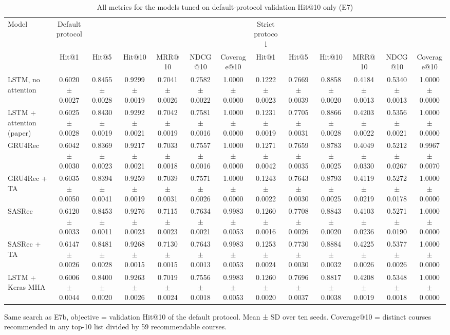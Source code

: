 \begin{table}[t]\centering\footnotesize
\caption{All metrics for the models tuned on default-protocol validation Hit@10 only (E7)}
\begin{tabular}{lcccccccccccc}\toprule
Model & Default protocol &  &  &  &  &  & Strict protocol &  &  &  &  &  \\
 & Hit@1 & Hit@5 & Hit@10 & MRR@10 & NDCG@10 & Coverage@10 & Hit@1 & Hit@5 & Hit@10 & MRR@10 & NDCG@10 & Coverage@10 \\
\midrule
LSTM, no attention & 0.6020 $\pm$ 0.0027 & 0.8455 $\pm$ 0.0028 & 0.9299 $\pm$ 0.0019 & 0.7041 $\pm$ 0.0026 & 0.7582 $\pm$ 0.0022 & 1.0000 $\pm$ 0.0000 & 0.1222 $\pm$ 0.0023 & 0.7669 $\pm$ 0.0039 & 0.8858 $\pm$ 0.0020 & 0.4184 $\pm$ 0.0013 & 0.5340 $\pm$ 0.0013 & 1.0000 $\pm$ 0.0000 \\
LSTM + attention (paper) & 0.6025 $\pm$ 0.0028 & 0.8430 $\pm$ 0.0019 & 0.9292 $\pm$ 0.0021 & 0.7042 $\pm$ 0.0019 & 0.7581 $\pm$ 0.0016 & 1.0000 $\pm$ 0.0000 & 0.1231 $\pm$ 0.0019 & 0.7705 $\pm$ 0.0031 & 0.8866 $\pm$ 0.0028 & 0.4203 $\pm$ 0.0022 & 0.5356 $\pm$ 0.0021 & 1.0000 $\pm$ 0.0000 \\
GRU4Rec & 0.6042 $\pm$ 0.0030 & 0.8369 $\pm$ 0.0023 & 0.9217 $\pm$ 0.0021 & 0.7033 $\pm$ 0.0018 & 0.7557 $\pm$ 0.0016 & 1.0000 $\pm$ 0.0000 & 0.1271 $\pm$ 0.0042 & 0.7659 $\pm$ 0.0035 & 0.8783 $\pm$ 0.0025 & 0.4049 $\pm$ 0.0330 & 0.5212 $\pm$ 0.0267 & 0.9967 $\pm$ 0.0070 \\
GRU4Rec + TA & 0.6035 $\pm$ 0.0050 & 0.8394 $\pm$ 0.0041 & 0.9259 $\pm$ 0.0019 & 0.7039 $\pm$ 0.0031 & 0.7571 $\pm$ 0.0026 & 1.0000 $\pm$ 0.0000 & 0.1243 $\pm$ 0.0022 & 0.7643 $\pm$ 0.0030 & 0.8793 $\pm$ 0.0025 & 0.4119 $\pm$ 0.0219 & 0.5272 $\pm$ 0.0178 & 1.0000 $\pm$ 0.0000 \\
SASRec & 0.6120 $\pm$ 0.0033 & 0.8453 $\pm$ 0.0011 & 0.9276 $\pm$ 0.0023 & 0.7115 $\pm$ 0.0023 & 0.7634 $\pm$ 0.0021 & 0.9983 $\pm$ 0.0053 & 0.1260 $\pm$ 0.0016 & 0.7708 $\pm$ 0.0026 & 0.8843 $\pm$ 0.0020 & 0.4103 $\pm$ 0.0236 & 0.5271 $\pm$ 0.0190 & 1.0000 $\pm$ 0.0000 \\
SASRec + TA & 0.6147 $\pm$ 0.0026 & 0.8481 $\pm$ 0.0028 & 0.9268 $\pm$ 0.0015 & 0.7130 $\pm$ 0.0015 & 0.7643 $\pm$ 0.0013 & 0.9983 $\pm$ 0.0053 & 0.1253 $\pm$ 0.0024 & 0.7730 $\pm$ 0.0030 & 0.8884 $\pm$ 0.0032 & 0.4225 $\pm$ 0.0026 & 0.5377 $\pm$ 0.0026 & 1.0000 $\pm$ 0.0000 \\
LSTM + Keras MHA & 0.6006 $\pm$ 0.0044 & 0.8400 $\pm$ 0.0020 & 0.9263 $\pm$ 0.0026 & 0.7019 $\pm$ 0.0024 & 0.7556 $\pm$ 0.0018 & 0.9983 $\pm$ 0.0053 & 0.1260 $\pm$ 0.0020 & 0.7696 $\pm$ 0.0037 & 0.8817 $\pm$ 0.0038 & 0.4208 $\pm$ 0.0019 & 0.5348 $\pm$ 0.0018 & 1.0000 $\pm$ 0.0000 \\
\bottomrule
\end{tabular}
\par\smallskip\footnotesize Same search as E7b, objective = validation Hit@10 of the default protocol. Mean ± SD over ten seeds. Coverage@10 = distinct courses recommended in any top-10 list divided by 59 recommendable courses.
\end{table}